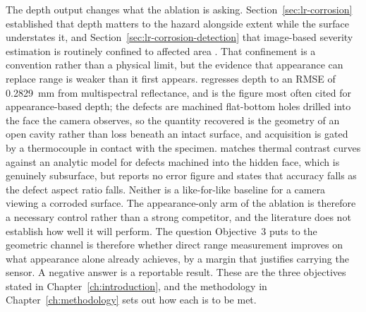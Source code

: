 The depth output changes what the ablation is asking.
Section~\ref{sec:lr-corrosion} established that depth matters to the hazard alongside extent while the
surface understates it, and Section~\ref{sec:lr-corrosion-detection} that
image-based severity estimation is routinely confined to affected area
\citep{Alvani2026}. That confinement is a convention rather than a
physical limit, but the evidence that appearance can replace range is weaker
than it first appears. \citet{Egodawela2025} regresses depth to an RMSE of
0.2829~mm from multispectral reflectance, and is the figure most often cited for
appearance-based depth; the defects are machined flat-bottom holes drilled into
the face the camera observes, so the quantity recovered is the geometry of an
open cavity rather than loss beneath an intact surface, and acquisition is gated
by a thermocouple in contact with the specimen.
\citet{Doshvarpassand2022} matches thermal contrast curves against an analytic
model for defects machined into the hidden face, which is genuinely subsurface,
but reports no error figure and states that accuracy falls as the defect
aspect ratio falls. Neither is a like-for-like baseline for a camera viewing a
corroded surface. The appearance-only arm of the ablation is therefore a
necessary control rather than a strong competitor, and the literature does not
establish how well it will perform. The
question Objective~3 puts to the geometric channel is therefore whether direct
range measurement improves on what appearance alone already achieves, by a
margin that justifies carrying the sensor. A negative answer is a reportable
result. These are the three objectives stated in
Chapter~\ref{ch:introduction}, and the methodology in
Chapter~\ref{ch:methodology} sets out how each is to be met.
